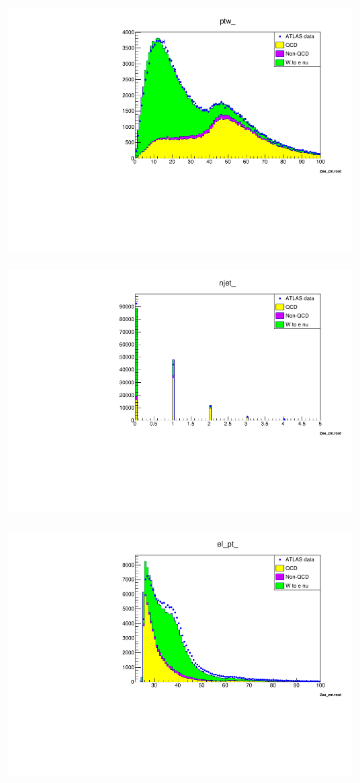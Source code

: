     \begin{figure}
        \begin{subfigure}{0.5\textwidth}
            \includegraphics[width=\textwidth]{../W_mass/ptw_100_0_100_qcd0-42.pdf}
        \end{subfigure}
        \begin{subfigure}{0.5\textwidth}
            \includegraphics[width=\textwidth]{../W_mass/njet_100_0_5_qcd0-42.pdf}
        \end{subfigure}
        \begin{subfigure}{0.5\textwidth}
            \includegraphics[width=\textwidth]{../W_mass/elpt_100_25_100_qcd0-35.pdf}

\end{subfigure}
\end{figure}
